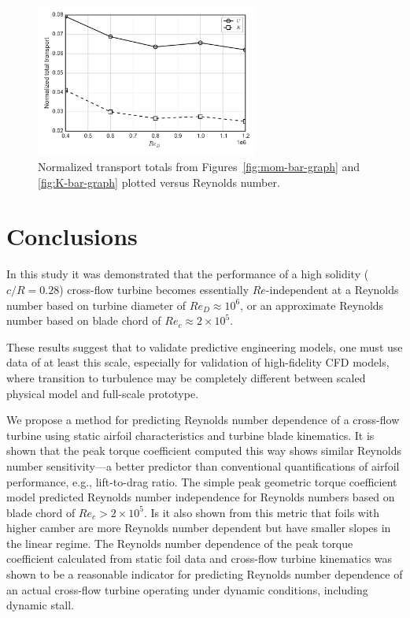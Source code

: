\documentclass[energies,article,accept,moreauthors,pdftex,12pt,a4paper]{mdpi}
\begin{document}
\begin{figure}[ht!]
\centering
\includegraphics[width=0.65\textwidth]{figures/wake_trans_totals}
\caption{Normalized transport totals from Figures~\ref{fig:mom-bar-graph} and
\ref{fig:K-bar-graph} plotted versus Reynolds number.}
\label{fig:wake-trans-totals}
\end{figure}


\section{Conclusions}

In this study it was demonstrated that the performance of a high solidity
($c/R=0.28$) cross-flow turbine becomes essentially $Re$-independent at a
Reynolds number based on turbine diameter of $Re_D \approx 10^6$, or an
approximate Reynolds number based on blade chord of $Re_c \approx 2 \times
10^5$.

These results suggest that to validate predictive engineering models, one must
use data of at least this scale, especially for validation of high-fidelity CFD
models, where transition to turbulence may be completely different between
scaled physical model and full-scale prototype.

We propose a method for predicting Reynolds number dependence of a cross-flow
turbine using static airfoil characteristics and turbine blade kinematics. It is
shown that the peak torque coefficient computed this way shows similar Reynolds
number sensitivity---a better predictor than conventional quantifications of
airfoil performance, e.g., lift-to-drag ratio. The simple peak geometric torque
coefficient model predicted Reynolds number independence for Reynolds numbers
based on blade chord of $Re_c > 2 \times 10^5$. Is it also shown from this
metric that foils with higher camber are more Reynolds number dependent but have
smaller slopes in the linear regime. The Reynolds number dependence of the peak
torque coefficient calculated from static foil data and cross-flow turbine
kinematics was shown to be a reasonable indicator for predicting Reynolds number
dependence of an actual cross-flow turbine operating under dynamic conditions,
including dynamic stall.
\end{document}
